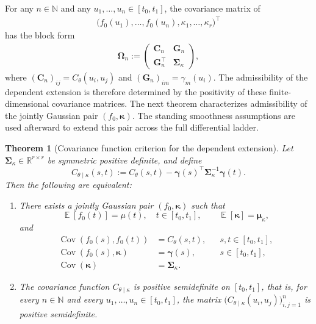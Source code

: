 \documentclass[11pt,a4paper]{article}
\newtheorem{theorem}{Theorem}
\theoremstyle{definition}
\theoremstyle{remark}
\DeclareMathOperator{\E}{\mathbb{E}}
\DeclareMathOperator{\Cov}{Cov}
\begin{document}
For any $n\in\mathbb{N}$ and any $u_1,\ldots,u_n\in[t_0,t_1]$, the covariance matrix of
\begin{align*}
\bigl(f_0(u_1),\ldots,f_0(u_n),\kappa_1,\ldots,\kappa_r\bigr)^\top
\end{align*}
has the block form
\begin{align*}
\boldsymbol{\Omega}_n:=
\begin{pmatrix}
\mathbf{C}_n & \mathbf{G}_n\\
\mathbf{G}_n^\top & \boldsymbol{\Sigma}_{\kappa}
\end{pmatrix},
\end{align*}
where \((\mathbf{C}_n)_{ij}=C_\theta(u_i,u_j)\) and \((\mathbf{G}_n)_{im}=\gamma_m(u_i)\). The admissibility of the dependent extension is therefore determined by the positivity of these finite-dimensional covariance matrices. The next theorem characterizes admissibility of the jointly Gaussian pair \((f_0,\boldsymbol{\kappa})\). The standing smoothness assumptions are used afterward to extend this pair across the full differential ladder.

\begin{theorem}[Covariance function criterion for the dependent extension]\label{thm:appendix-schur}
Let \(\boldsymbol{\Sigma}_{\kappa}\in\mathbb R^{r\times r}\) be symmetric positive definite, and define
\[
C_{\theta\mid\kappa}(s,t):=C_\theta(s,t)-\boldsymbol\gamma(s)^\top\boldsymbol{\Sigma}_{\kappa}^{-1}\boldsymbol{\gamma}(t).
\]
Then the following are equivalent:
\begin{enumerate}
\item There exists a jointly Gaussian pair \((f_0,\boldsymbol{\kappa})\) such that
\[
\E[f_0(t)]=\mu(t),\quad t\in[t_0,t_1],
\qquad
\E[\boldsymbol{\kappa}]=\boldsymbol{\mu}_\kappa,
\]
and
\begin{align*}
\Cov(f_0(s),f_0(t))&=C_\theta(s,t), && s,t\in[t_0,t_1],\\
\Cov(f_0(s),\boldsymbol{\kappa})&=\boldsymbol{\gamma}(s), && s\in[t_0,t_1],\\
\Cov(\boldsymbol{\kappa})&=\boldsymbol{\Sigma}_{\kappa}.
\end{align*}
\item The covariance function \(C_{\theta\mid\kappa}\) is positive semidefinite on \([t_0,t_1]\), that is, for every \(n\in\mathbb{N}\) and every \(u_1,\ldots,u_n\in[t_0,t_1]\), the matrix \(\bigl(C_{\theta\mid\kappa}(u_i,u_j)\bigr)_{i,j=1}^n\) is positive semidefinite.
\end{enumerate}
\end{theorem}
\end{document}
